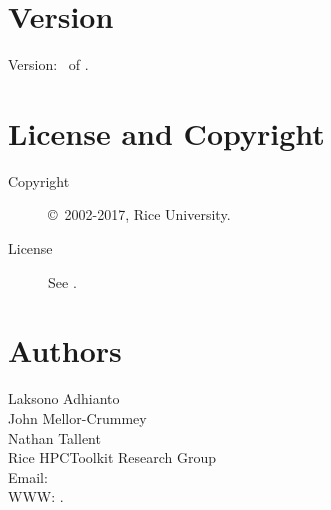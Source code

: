 \documentclass[english]{article}
\begin{document}
\section{Version}

Version: \Version\ of \Date.

\section{License and Copyright}

\begin{description}
\item[Copyright] \copyright\ 2002-2017, Rice University.
\item[License] See .
\end{description}

\section{Authors}

\noindent
Laksono Adhianto \\
John Mellor-Crummey \\
Nathan Tallent \\
Rice HPCToolkit Research Group \\
Email:  \\
WWW: .

\LatexManEnd
\end{document}

